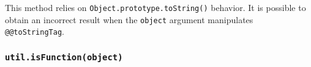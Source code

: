 \begin{Shaded}
\begin{Highlighting}[]
\OperatorTok{=} \NormalTok{(}\NormalTok{)}\OperatorTok{;}

\NormalTok{(} \NormalTok{())}\OperatorTok{;}
\NormalTok{(} \NormalTok{())}\OperatorTok{;}
\NormalTok{(\{ }\OperatorTok{:} \OperatorTok{,} \OperatorTok{:} \NormalTok{ \})}\OperatorTok{;}
\end{Highlighting}
\end{Shaded}

This method relies on \texttt{Object.prototype.toString()} behavior. It
is possible to obtain an incorrect result when the \texttt{object}
argument manipulates \texttt{@@toStringTag}.

\begin{Shaded}
\begin{Highlighting}[]
\OperatorTok{=} \NormalTok{(}\NormalTok{)}\OperatorTok{;}
\OperatorTok{=}\NormalTok{ \{ }\OperatorTok{:} \OperatorTok{,} \OperatorTok{:} \NormalTok{ \}}\OperatorTok{;}

\OperatorTok{;}
\NormalTok{obj[}\NormalTok{] }\OperatorTok{=} \OperatorTok{;}
\OperatorTok{;}
\end{Highlighting}
\end{Shaded}

\subsubsection{\texorpdfstring{\texttt{util.isFunction(object)}}{util.isFunction(object)}}\label{util.isfunctionobject}


